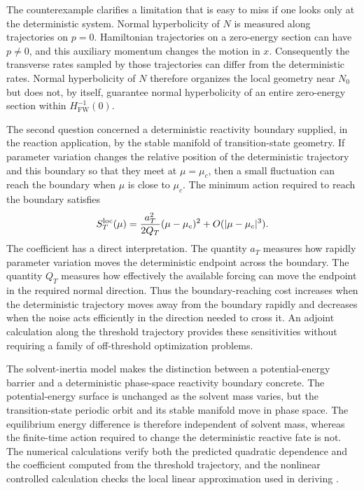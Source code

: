 \documentclass[11pt]{article}
\theoremstyle{definition}
\theoremstyle{remark}
\begin{document}
The counterexample clarifies a limitation that is easy to miss if one looks only at the deterministic system.  Normal hyperbolicity of $N$ is measured along trajectories on $p=0$.  Hamiltonian trajectories on a zero-energy section can have $p\ne0$, and this auxiliary momentum changes the motion in $x$.  Consequently the transverse rates sampled by those trajectories can differ from the deterministic rates.  Normal hyperbolicity of $N$ therefore organizes the local geometry near $N_0$ but does not, by itself, guarantee normal hyperbolicity of an entire zero-energy section within $H_{\mathrm{FW}}^{-1}(0)$.

The second question concerned a deterministic reactivity boundary supplied, in the reaction application, by the stable manifold of transition-state geometry.  If parameter variation changes the relative position of the deterministic trajectory and this boundary so that they meet at $\mu=\mu_c$, then a small fluctuation can reach the boundary when $\mu$ is close to $\mu_c$.  The minimum action required to reach the boundary satisfies
\[
S_T^{\rm loc}(\mu)
=\frac{a_T^2}{2Q_T}(\mu-\mu_c)^2+O(|\mu-\mu_c|^3).
\]
The coefficient has a direct interpretation.  The quantity $a_T$ measures how rapidly parameter variation moves the deterministic endpoint across the boundary.  The quantity $Q_T$ measures how effectively the available forcing can move the endpoint in the required normal direction.  Thus the boundary-reaching cost increases when the deterministic trajectory moves away from the boundary rapidly and decreases when the noise acts efficiently in the direction needed to cross it.  An adjoint calculation along the threshold trajectory provides these sensitivities without requiring a family of off-threshold optimization problems.

The solvent-inertia model makes the distinction between a potential-energy barrier and a deterministic phase-space reactivity boundary concrete.  The potential-energy surface is unchanged as the solvent mass varies, but the transition-state periodic orbit and its stable manifold move in phase space.  The equilibrium energy difference is therefore independent of solvent mass, whereas the finite-time action required to change the deterministic reactive fate is not.  The numerical calculations verify both the predicted quadratic dependence and the coefficient computed from the threshold trajectory, and the nonlinear controlled calculation checks the local linear approximation used in deriving .
\end{document}
